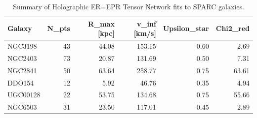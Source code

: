 \begin{table}
\caption{Summary of Holographic ER=EPR Tensor Network fits to SPARC galaxies.}
\label{tab:sparc_fits}
\begin{tabular}{lrrrrr}
\toprule
Galaxy & N_pts & R_max [kpc] & v_inf [km/s] & Upsilon_star & Chi2_red \\
\midrule
NGC3198 & 43 & 44.08 & 153.15 & 0.60 & 2.69 \\
NGC2403 & 73 & 20.87 & 131.69 & 0.50 & 7.31 \\
NGC2841 & 50 & 63.64 & 258.77 & 0.75 & 63.61 \\
DDO154 & 12 & 5.92 & 46.76 & 0.35 & 4.94 \\
UGC00128 & 22 & 53.75 & 134.68 & 0.75 & 55.66 \\
NGC6503 & 31 & 23.50 & 117.01 & 0.45 & 2.89 \\
\bottomrule
\end{tabular}
\end{table}

